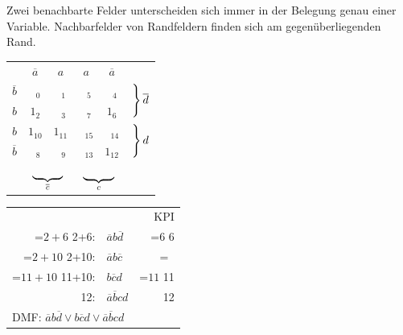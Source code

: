 \documentclass[10pt,a4paper]{scrartcl}
\newcommand\hcancel[2][black]{\setbox0=\hbox{$#2$}%
	\rlap{\raisebox{.45\ht0}{\textcolor{#1}{\rule{\wd0}{1pt}}}}#2}
\begin{document}
\begin{Hint}{}{}
	Zwei benachbarte Felder unterscheiden sich immer in der Belegung genau einer Variable. Nachbarfelder von Randfeldern finden sich am gegenüberliegenden Rand.
\end{Hint}

\begin{table}[h!]
	\centering
	\begin{tabular}{c|c|c|c|c|l}
		& $ \overline{a} $ & $ a $ & $ a $ & $ \overline{a} $ &\\ \cline{1-5}
		$ \overline{b} $ & $ \phantom{a}_0 $ & $ \phantom{a}_1 $ & $ \phantom{a}_5 $ & $ \phantom{a}_4 $& \multirow{2}{*}{$\begin{rcases*} \\ \\ \end{rcases*} \overline{d}$}\\ \cline{1-5}
		$ b $ & $ 1_2 $ & $ \phantom{a}_3 $ & $ \phantom{a}_7 $ & $ 1_6 $ \\ \cline{1-5}
		$ b $ & $ 1_{10} $ & $ 1_{11} $ & $ \phantom{a}_{15} $ & $ \phantom{a}_{14} $ & \multirow{2}{*}{$ \begin{rcases*} \\ \\ \end{rcases*} d $}\\ \cline{1-5}
		$ \overline{b} $ & $ \phantom{a}_{8} $ & $ \phantom{a}_{9} $ & $ \phantom{a}_{13} $ & $ 1_{12} $ \\ \cline{1-5}
		\multicolumn{1}{c}{}& \multicolumn{2}{c}{$ \underbrace{\hspace*{\dimexpr2\tabcolsep+1\arrayrulewidth}\hphantom{012}}_{\overline{c}} $}& \multicolumn{2}{c}{$ \underbrace{\hspace*{\dimexpr2\tabcolsep+1\arrayrulewidth}\hphantom{012}}_{c} $}
	\end{tabular}
	\quad
	\begin{tabular}{rlr}
		&& \ac{KPI}\\
		\hcancel[green]{2+6}: & $ \overline{a} b \overline{d} $ & \hcancel 6\\
		\hcancel[green]{2+10}:&$ \overline{a} b \overline{c} $ & \hcancel{\phantom{a}}\\
		\hcancel[green]{11+10}: & $ b\overline{c} d $& \hcancel[green]{11}\\
		12: & $ \overline{a}\overline{b}cd $ & 12\\
		\multicolumn{3}{l}{DMF: $ \overline{a} b \overline{d} \vee b\overline{c}d \vee \overline{a}\overline{b}cd $}\\

\end{tabular}
\end{table}
\end{document}
